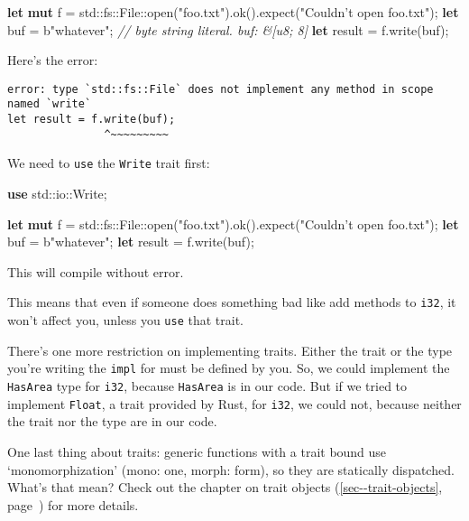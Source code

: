 \documentclass[a4paper,]{book}
\renewcommand*{\hyperref}[2][\ar]{%
  \def\ar{#2}%
  #2 (\autoref{#1}, page~\pageref{#1})}
\newenvironment{Shaded}{\begin{snugshade}}{\end{snugshade}}
\newcommand{\KeywordTok}[1]{\textcolor[rgb]{0.13,0.29,0.53}{\textbf{{#1}}}}
\newcommand{\StringTok}[1]{\textcolor[rgb]{0.31,0.60,0.02}{{#1}}}
\newcommand{\CommentTok}[1]{\textcolor[rgb]{0.56,0.35,0.01}{\textit{{#1}}}}
\newcommand{\NormalTok}[1]{{#1}}
\begin{document}
\begin{Shaded}
\begin{Highlighting}[]
\KeywordTok{let} \KeywordTok{mut} \NormalTok{f = std::fs::File::open(}\StringTok{"foo.txt"}\NormalTok{).ok().expect(}\StringTok{"Couldn’t open foo.txt"}\NormalTok{);}
\KeywordTok{let} \NormalTok{buf = b}\StringTok{"whatever"}\NormalTok{; }\CommentTok{// byte string literal. buf: &[u8; 8]}
\KeywordTok{let} \NormalTok{result = f.write(buf);}
\end{Highlighting}
\end{Shaded}

Here's the error:

\begin{verbatim}
error: type `std::fs::File` does not implement any method in scope named `write`
let result = f.write(buf);
               ^~~~~~~~~~
\end{verbatim}

We need to \texttt{use} the \texttt{Write} trait first:

\begin{Shaded}
\begin{Highlighting}[]
\KeywordTok{use} \NormalTok{std::io::Write;}

\KeywordTok{let} \KeywordTok{mut} \NormalTok{f = std::fs::File::open(}\StringTok{"foo.txt"}\NormalTok{).ok().expect(}\StringTok{"Couldn’t open foo.txt"}\NormalTok{);}
\KeywordTok{let} \NormalTok{buf = b}\StringTok{"whatever"}\NormalTok{;}
\KeywordTok{let} \NormalTok{result = f.write(buf);}
\end{Highlighting}
\end{Shaded}

This will compile without error.

This means that even if someone does something bad like add methods to
\texttt{i32}, it won't affect you, unless you \texttt{use} that trait.

There's one more restriction on implementing traits. Either the trait or
the type you're writing the \texttt{impl} for must be defined by you.
So, we could implement the \texttt{HasArea} type for \texttt{i32},
because \texttt{HasArea} is in our code. But if we tried to implement
\texttt{Float}, a trait provided by Rust, for \texttt{i32}, we could
not, because neither the trait nor the type are in our code.

One last thing about traits: generic functions with a trait bound use
`monomorphization' (mono: one, morph: form), so they are statically
dispatched. What's that mean? Check out the chapter on
\hyperref[sec--trait-objects]{trait objects} for more details.
\end{document}
